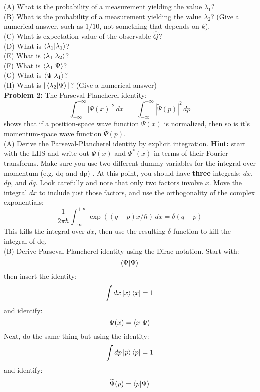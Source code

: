 \documentclass[12pt]{article}
\begin{document}
\noindent
(A) What is the probability of a measurement yielding the value $\lambda_1$?\\[5pt]

\noindent
(B) What is the probability of a measurement yielding the value $\lambda_2$?  (Give a numerical answer, such as $1/10$, not something that depends on $k$).\\[5pt]

\noindent
(C) What is expectation value of the observable $\hat{Q}$?\\[5pt]

\noindent
(D) What is $\braket{\lambda_1 | \lambda_1}$?\\[5pt]

\noindent
(E) What is $\braket{\lambda_1 | \lambda_2}$?\\[5pt]

\noindent
(F) What is $\braket{\lambda_1 | \Psi}$?\\[5pt]

\noindent
(G) What is $\braket{\Psi | \lambda_1}$?\\[5pt]

\noindent
(H) What is $|\braket{\lambda_2 | \Psi}|$?  (Give a numerical answer)\\[5pt]


\noindent
{\bf Problem 2:} The Parseval-Plancherel identity:
$$\int_{-\infty}^{+\infty} |\Psi(x)|^2 \, dx \; = \; \int_{-\infty}^{+\infty} |\widetilde{\Psi}(p)|^2 \, dp$$
shows that if a position-space wave function $\Psi(x)$ is normalized, then so is it's momentum-space wave function $\widetilde{\Psi}(p)$.\\[5pt]

\noindent
(A) Derive the Parseval-Plancherel identity by explicit integration.  {\bf Hint:  } start with the LHS and write out $\Psi(x)$ and $\Psi^*(x)$ in terms of their Fourier transforms.  Make sure you use two different dummy variables for the integral over momentum (e.g. dq and dp) .  At this point, you should have {\bf three} integrals: $dx$,$dp$, and $dq$.  Look carefully and note that only two factors involve $x$.  Move the integral $dx$ to include just those factors, and use the orthogonality of the complex exponentials:
$$\frac{1}{2\pi\hbar}\int_{-\infty}^{+\infty} \exp((q-p)x/\hbar) \, dx = \delta(q-p)$$
This kills the integral over $dx$, then use the resulting $\delta$-function to kill the integral of dq.\\[5pt]

\noindent
(B) Derive Parseval-Plancherel identity using the Dirac notation.  Start with:
$$\braket{\Psi|\Psi}$$
then insert the identity:
$$\int dx \ket{x}\bra{x} = 1$$
and identify:
$$\Psi(x) = \braket{x|\Psi}$$
Next, do the same thing but using the identity:
$$\int dp \ket{p}\bra{p} = 1$$
and identify:
$$\widetilde{\Psi}(p) = \braket{p|\Psi}$$
\end{document}
